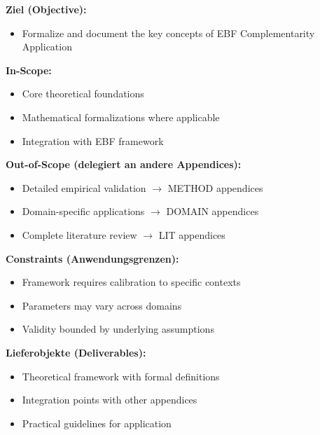
\begin{tcolorbox}[
    colback=orange!5!white,
    colframe=orange!75!black,
    title={\textbf{Appendix Scope: Ziel / In-Scope / Out-of-Scope / Constraints}},
    fonttitle=\bfseries
]

\textbf{Ziel (Objective):}
\begin{itemize}[nosep]
    \item Formalize and document the key concepts of EBF Complementarity Application
\end{itemize}

\textbf{In-Scope:}
\begin{itemize}[nosep]
    \item Core theoretical foundations
    \item Mathematical formalizations where applicable
    \item Integration with EBF framework
\end{itemize}

\textbf{Out-of-Scope (delegiert an andere Appendices):}
\begin{itemize}[nosep]
    \item Detailed empirical validation $\rightarrow$ METHOD appendices
    \item Domain-specific applications $\rightarrow$ DOMAIN appendices
    \item Complete literature review $\rightarrow$ LIT appendices
\end{itemize}

\textbf{Constraints (Anwendungsgrenzen):}
\begin{itemize}[nosep]
    \item Framework requires calibration to specific contexts
    \item Parameters may vary across domains
    \item Validity bounded by underlying assumptions
\end{itemize}

\textbf{Lieferobjekte (Deliverables):}
\begin{itemize}[nosep]
    \item Theoretical framework with formal definitions
    \item Integration points with other appendices
    \item Practical guidelines for application
\end{itemize}

\end{tcolorbox}




